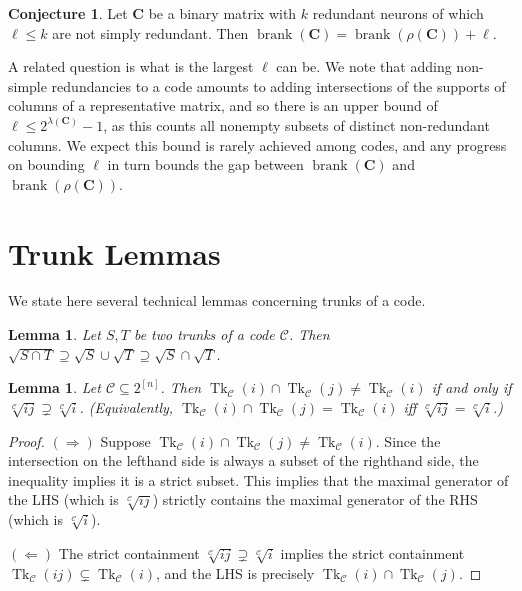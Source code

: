 \documentclass[11pt,letterpaper, reqno]{amsart}
\newtheorem{lem}[thm]{Lemma}         %
\theoremstyle{definition}
\newtheorem{conj}[thm]{Conjecture}        %
\DeclareMathOperator{\tk}{Tk}
\DeclareMathOperator{\brank}{brank}
\def\bC{\mathbf{C}}
\def\cC{\mathcal{C}}
\begin{document}
    \begin{conj}
        Let $\bC$ be a binary matrix with $k$ redundant neurons of which $\ell \leq k$ are not simply redundant. Then $\brank(\bC) = \brank(\rho(\bC)) + \ell$.
    \end{conj}

    A related question is what is the largest $\ell$ can be. We note that adding non-simple redundancies to a code amounts to adding intersections of the supports of columns of a representative matrix, and so there is an upper bound of $\ell \leq 2^{\lambda(\bC)} - 1$, as this counts all nonempty subsets of distinct non-redundant columns. We expect this bound is rarely achieved among codes, and any progress on bounding $\ell$ in turn bounds the gap between $\brank(\bC)$ and $\brank(\rho(\bC))$.

    







\appendix
\section{Trunk Lemmas}\label{sec:trunklemmas}
    We state here several technical lemmas concerning trunks of a code.

    
    \begin{lem}\label{lem:rootsofintersections}
        Let $S,T$ be two trunks of a code $\cC$. Then $\sqrt{S \cap T} \supseteq \sqrt{S} \cup \sqrt{T} \supseteq \sqrt{S} \cap \sqrt{T}$.
    \end{lem}

    \begin{lem}\label{lem:trunkrootcontainment}
        Let $\cC \subseteq 2^{[n]}$.
        Then $\tk_\cC(i) \cap \tk_\cC(j) \neq \tk_\cC(i)$ if and only if $\sqrt[\cC]{ij} \supsetneq \sqrt[\cC]{i}$. (Equivalently, $\tk_\cC(i) \cap \tk_\cC(j) = \tk_\cC(i)$ iff $\sqrt[\cC]{ij} = \sqrt[\cC]{i}$.)
    \end{lem}
    \begin{proof}
        $(\Rightarrow)$ Suppose $\tk_\cC(i) \cap \tk_\cC(j) \neq \tk_\cC(i)$. Since the intersection on the lefthand side is always a subset of the righthand side, the inequality implies it is a strict subset. This implies that the maximal generator of the LHS (which is $\sqrt[\cC]{ij}$) strictly contains the maximal generator of the RHS (which is $\sqrt[\cC]{i}$).
        
        $(\Leftarrow)$ The strict containment $\sqrt[\cC]{ij} \supsetneq \sqrt[\cC]{i}$ implies the strict containment $\tk_\cC(ij) \subsetneq \tk_\cC(i)$, and the LHS is precisely $\tk_\cC(i) \cap \tk_\cC(j)$.
    \end{proof}
\end{document}
